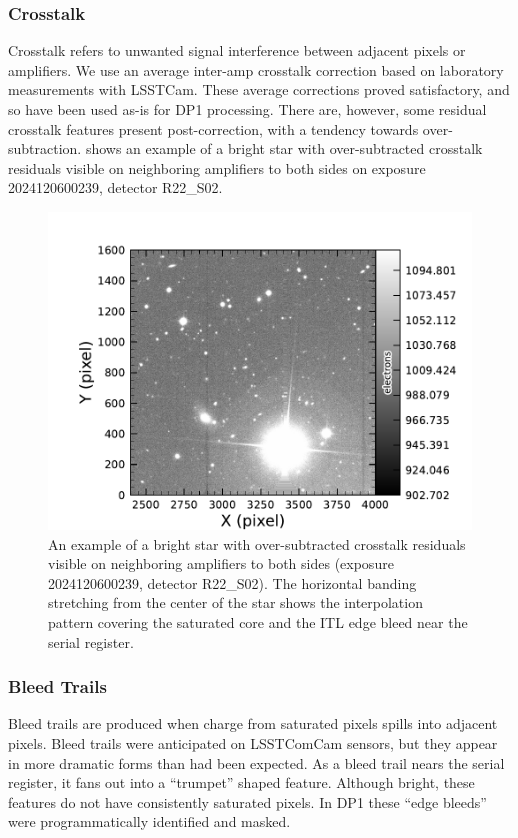 \subsubsection{Crosstalk}
Crosstalk refers to unwanted signal interference between adjacent pixels or amplifiers.
We use an average inter-amp crosstalk correction based on laboratory measurements with LSSTCam.
These average corrections proved satisfactory, and so have been used as-is for DP1 processing.
There are, however, some residual crosstalk features present post-correction, with a tendency towards over-subtraction.
 shows an example  of a bright star with over-subtracted crosstalk residuals visible on neighboring amplifiers to both sides on exposure 2024120600239, detector R22\_S02.
\begin{figure}[htb!]
  \centering
  \includegraphics[width=0.98\linewidth]{figures/dp1_isr_anomalies-crosstalk_residual.pdf}
  \caption{An example of a bright star with over-subtracted crosstalk residuals visible on neighboring amplifiers to both sides (exposure 2024120600239, detector R22\_S02).
  The horizontal banding stretching from the center of the star shows the interpolation pattern covering the saturated core and the ITL edge bleed near the serial register.}
  \label{fig:crosstalk_residual}
\end{figure}

\subsubsection{Bleed Trails}
Bleed trails are produced when charge from saturated pixels spills into adjacent pixels.
Bleed trails were anticipated on LSSTComCam sensors, but they appear in more dramatic forms than had been expected.
As a bleed trail nears the serial register, it fans out into a ``trumpet'' shaped feature.
Although bright, these features do not have consistently saturated pixels.
In DP1 these ``edge bleeds'' were programmatically identified and masked.

